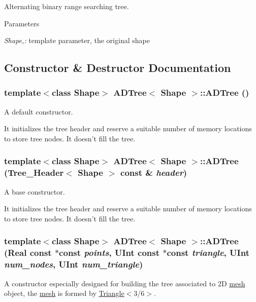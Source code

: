 Alternating binary range searching tree. 
\begin{DoxyParams}{Parameters}
\item[{\em Shape,:}]template parameter, the original shape \end{DoxyParams}


\subsection{Constructor \& Destructor Documentation}
\hypertarget{classADTree_a77cc7dfe39cabdd41316ff2e7dcfccd0}{
\subsubsection[{ADTree}]{\setlength{\rightskip}{0pt plus 5cm}template$<$class Shape$>$ {\bf ADTree}$<$ Shape $>$::{\bf ADTree} ()}}
\label{classADTree_a77cc7dfe39cabdd41316ff2e7dcfccd0}
A default constructor.

It initializes the tree header and reserve a suitable number of memory locations to store tree nodes. It doesn't fill the tree. \hypertarget{classADTree_aa66f88d51019999814be20c17663fc29}{
\subsubsection[{ADTree}]{\setlength{\rightskip}{0pt plus 5cm}template$<$class Shape$>$ {\bf ADTree}$<$ Shape $>$::{\bf ADTree} ({\bf Tree\_\-Header}$<$ Shape $>$ const \& {\em header})}}
\label{classADTree_aa66f88d51019999814be20c17663fc29}
A base constructor.

It initializes the tree header and reserve a suitable number of memory locations to store tree nodes. It doesn't fill the tree. \hypertarget{classADTree_aec2a21cd072f346853968b5b9cf9cee5}{
\subsubsection[{ADTree}]{\setlength{\rightskip}{0pt plus 5cm}template$<$class Shape$>$ {\bf ADTree}$<$ Shape $>$::{\bf ADTree} (Real const $\ast$const  {\em points}, \/  UInt const $\ast$const  {\em triangle}, \/  UInt {\em num\_\-nodes}, \/  UInt {\em num\_\-triangle})}}
\label{classADTree_aec2a21cd072f346853968b5b9cf9cee5}
A constructor especially designed for building the tree associated to 2D \hyperlink{structmesh}{mesh} object, the \hyperlink{structmesh}{mesh} is formed by \hyperlink{classTriangle}{Triangle}$<$3/6$>$.

